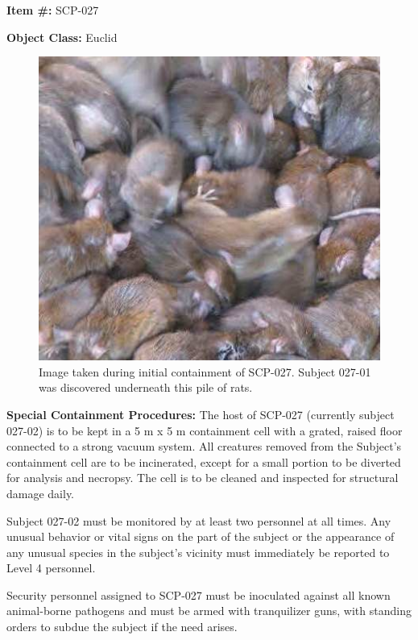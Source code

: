 
\textbf{Item \#:} SCP-027

\textbf{Object Class:} Euclid

\begin{figure}[h]
\begin{center}
\includegraphics[scale=0.65]{scp/027.jpg}
\linebreak Image taken during initial containment of SCP-027. Subject 027-01 was discovered underneath this pile of rats.
\end{center}
\end{figure}

\textbf{Special Containment Procedures:} The host of SCP-027 (currently subject 027-02) is to be kept in a 5 m x 5 m containment cell with a grated, raised floor connected to a strong vacuum system. All creatures removed from the Subject's containment cell are to be incinerated, except for a small portion to be diverted for analysis and necropsy. The cell is to be cleaned and inspected for structural damage daily.

Subject 027-02 must be monitored by at least two personnel at all times. Any unusual behavior or vital signs on the part of the subject or the appearance of any unusual species in the subject’s vicinity must immediately be reported to Level 4 personnel.

Security personnel assigned to SCP-027 must be inoculated against all known animal-borne pathogens and must be armed with tranquilizer guns, with standing orders to subdue the subject if the need arises.


